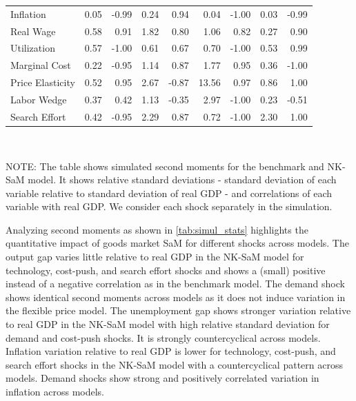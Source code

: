 \documentclass[12pt,3p,authoryear,review]{elsarticle}
\begin{document}
\begin{table}[t]
\begin{center}
\begin{footnotesize}
\begin{tabular}{l r r r r r r r r}
				Inflation & 0.05 & -0.99 & 0.24 & 0.94 & 0.04 & -1.00 & 0.03 & -0.99\\%
				Real Wage & 0.58 & 0.91 & 1.82 & 0.80 & 1.06 & 0.82 & 0.27 & 0.90\\%
				Utilization & 0.57 & -1.00 & 0.61 & 0.67 & 0.70 & -1.00 & 0.53 & 0.99\\%
				Marginal Cost & 0.22 & -0.95 & 1.14 & 0.87 & 1.77 & 0.95 & 0.36 & -1.00\\%
				Price Elasticity & 0.52 & 0.95 & 2.67 & -0.87 & 13.56 & 0.97 & 0.86 & 1.00\\%
				Labor Wedge & 0.37 & 0.42 & 1.13 & -0.35 & 2.97 & -1.00 & 0.23 & -0.51\\%
				Search Effort & 0.42 & -0.95 & 2.29 & 0.87 & 0.72 & -1.00 & 2.30 & 1.00\\%
				\hline%
			\end{tabular}\\%
			{\tiny NOTE: The table shows simulated second moments for the benchmark and NK-SaM model. It shows relative standard deviations - standard deviation of each variable relative to standard deviation of real GDP - and correlations of each variable with real GDP. We consider each shock separately in the simulation.\par}%
		\end{footnotesize}%
	\end{center}%
\end{table}%
Analyzing second moments as shown in \cref{tab:simul_stats} highlights the quantitative impact of goods market SaM for different shocks across models. The output gap varies little relative to real GDP in the NK-SaM model for technology, cost-push, and search effort shocks and shows a (small) positive instead of a negative correlation as in the benchmark model. The demand shock shows identical second moments across models as it does not induce variation in the flexible price model. The unemployment gap shows stronger variation relative to real GDP in the NK-SaM model with high relative standard deviation for demand and cost-push shocks. It is strongly countercyclical across models. Inflation variation relative to real GDP is lower for technology, cost-push, and search effort shocks in the NK-SaM model with a countercyclical pattern across models. Demand shocks show strong and positively correlated variation in inflation across models.\\%
\end{document}
